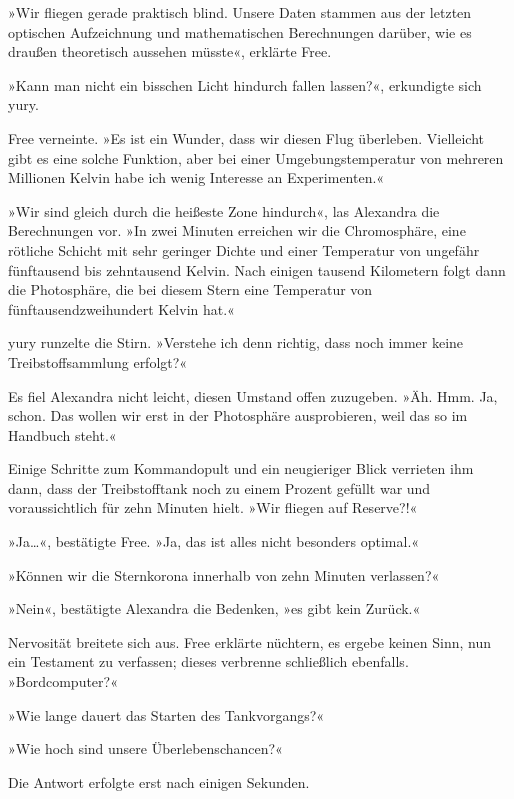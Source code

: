 »Wir fliegen gerade praktisch blind. Unsere Daten stammen aus der letzten optischen Aufzeichnung und mathematischen Berechnungen darüber, wie es draußen theoretisch aussehen müsste«, erklärte Free.

»Kann man nicht ein bisschen Licht hindurch fallen lassen?«, erkundigte sich yury.

Free verneinte. »Es ist ein Wunder, dass wir diesen Flug überleben. Vielleicht gibt es eine solche Funktion, aber bei einer Umgebungstemperatur von mehreren Millionen Kelvin habe ich wenig Interesse an Experimenten.«

»Wir sind gleich durch die heißeste Zone hindurch«, las Alexandra die Berechnungen vor. »In zwei Minuten erreichen wir die Chromosphäre, eine rötliche Schicht mit sehr geringer Dichte und einer Temperatur von ungefähr fünftausend bis zehntausend Kelvin. Nach einigen tausend Kilometern folgt dann die Photosphäre, die bei diesem Stern eine Temperatur von fünftausendzweihundert Kelvin hat.«

yury runzelte die Stirn. »Verstehe ich denn richtig, dass noch immer keine Treibstoffsammlung erfolgt?«

Es fiel Alexandra nicht leicht, diesen Umstand offen zuzugeben. »Äh. Hmm. Ja, schon. Das wollen wir erst in der Photosphäre ausprobieren, weil das so im Handbuch steht.«

Einige Schritte zum Kommandopult und ein neugieriger Blick verrieten ihm dann, dass der Treibstofftank noch zu einem Prozent gefüllt war und voraussichtlich für zehn Minuten hielt. »Wir fliegen auf Reserve?!«

»Ja…«, bestätigte Free. »Ja, das ist alles nicht besonders optimal.«

»Können wir die Sternkorona innerhalb von zehn Minuten verlassen?«

»Nein«, bestätigte Alexandra die Bedenken, »es gibt kein Zurück.«

Nervosität breitete sich aus. Free erklärte nüchtern, es ergebe keinen Sinn, nun ein Testament zu verfassen; dieses verbrenne schließlich ebenfalls. »Bordcomputer?«


»Wie lange dauert das Starten des Tankvorgangs?«


»Wie hoch sind unsere Überlebenschancen?«

Die Antwort erfolgte erst nach einigen Sekunden. 


